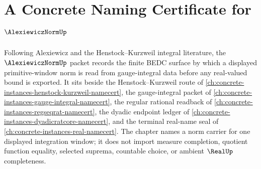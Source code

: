 \chapter{A Concrete Naming Certificate for $\AlexiewiczNormUp$}
\label{ch:concrete-instances-alexiewicz-norm-namecert}

Following Alexiewicz and the Henstock--Kurzweil integral literature, the $\AlexiewiczNormUp$ packet records the finite BEDC surface by which a displayed primitive-window norm is read from gauge-integral data before any real-valued bound is exported. It sits beside the Henstock--Kurzweil route of \autoref{ch:concrete-instances-henstock-kurzweil-namecert}, the gauge-integral packet of \autoref{ch:concrete-instances-gauge-integral-namecert}, the regular rational readback of \autoref{ch:concrete-instances-regseqrat-namecert}, the dyadic endpoint ledger of \autoref{ch:concrete-instances-dyadicratcore-namecert}, and the terminal real-name seal of \autoref{ch:concrete-instances-real-namecert}. The chapter names a norm carrier for one displayed integration window; it does not import measure completion, quotient function equality, selected suprema, countable choice, or ambient $\RealUp$ completeness.

